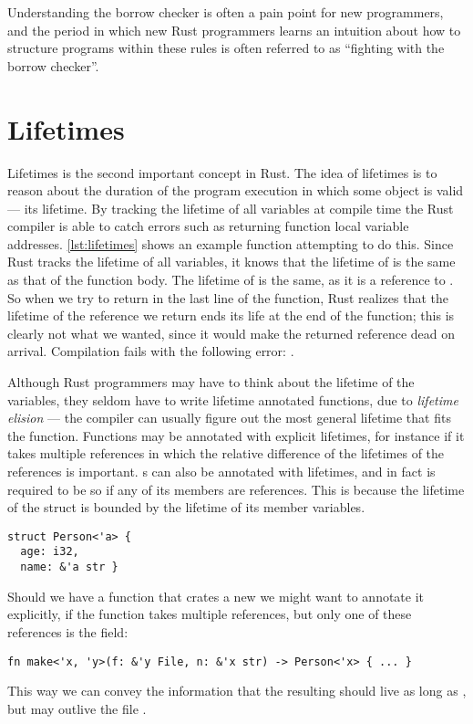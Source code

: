 

Understanding the borrow checker is often a pain point for new programmers, and the period in which
new Rust programmers learns an intuition about how to structure programs within these rules is
often referred to as ``fighting with the borrow checker''.


\section{Lifetimes\label{sec:rust-lifetimes}}

Lifetimes is the second important concept in Rust. The idea of lifetimes is to reason about the
duration of the program execution in which some object is valid --- its lifetime. By tracking the
lifetime of all variables at compile time the Rust compiler is able to catch errors such as
returning function local variable addresses. \cref{lst:lifetimes} shows an example function
attempting to do this.   Since Rust tracks the lifetime of all variables,
it knows that the lifetime of  is the same as that of the function body. The lifetime of
 is the same, as it is a reference to . So when we try to return  in the
last line of the function, Rust realizes that the lifetime of the reference we return ends its life
at the end of the function; this is clearly not what we wanted, since it would make the returned
reference dead on arrival. Compilation fails with the following error: .


Although Rust programmers may have to think about the lifetime of the variables, they seldom have
to write lifetime annotated functions, due to \emph{lifetime elision} --- the compiler can usually
figure out the most general lifetime that fits the function. Functions may be annotated with
explicit lifetimes, for instance if it takes multiple references in which the relative difference
of the lifetimes of the references is important.
s can also be annotated with lifetimes, and in fact is required to be so if any of its
members are references. This is because the lifetime of the struct is bounded by the lifetime of
its member variables.
\begin{lstlisting}[style=Rust]
struct Person<'a> {
  age: i32,
  name: &'a str }
\end{lstlisting}
Should we have a function that crates a new  we might want to annotate it explicitly,
if the function takes multiple references, but only one of these references is the 
field:
\begin{lstlisting}[style=Rust]
fn make<'x, 'y>(f: &'y File, n: &'x str) -> Person<'x> { ... }
\end{lstlisting}
This way we can convey the information that the resulting  should live as long as
, but may outlive the file .




